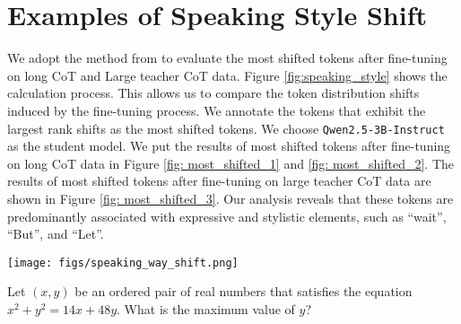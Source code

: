 
\section{Examples of Speaking Style Shift}
\label{Examples of Speaking Style Shift}
We adopt the method from  \citep{lin2023unlockingspellbasellms} to evaluate the most shifted tokens after fine-tuning on long CoT and Large teacher CoT data. Figure \ref{fig:speaking_style} shows the calculation process. This allows us to compare the token distribution shifts induced by the fine-tuning process. We annotate the tokens that exhibit the largest rank shifts as the most shifted tokens. We choose \texttt{Qwen2.5-3B-Instruct} as the student model. We put the results of most shifted tokens after fine-tuning on long CoT data in Figure \ref{fig: most_shifted_1} and \ref{fig: most_shifted_2}. The results of most shifted tokens after fine-tuning on large teacher CoT data are shown in Figure \ref{fig: most_shifted_3}. Our analysis reveals that these tokens are predominantly associated with expressive and stylistic elements, such as “wait”, “But”, and “Let”. 


\begin{figure*}[!t]
    \centering
    \texttt{[image: figs/speaking\_way\_shift.png]}
    \caption{The process of calculating most shifted tokens. We decode each token generated by the fine-tuned LLM in the student model before fine-tuning. Then we calculate the rank shift in the student model for each token generated by the fine-tuned model. We annotate the tokens that exhibit the largest rank shifts as the most shifted tokens. We found that these tokens are predominantly associated with expressive and stylistic elements, such as “But” and “Let”.}
    \label{fig:speaking_style}
\end{figure*}


\begin{figure*}[htbp]
    \centering
\begin{tcolorbox}[title=Problem, promptstyle]
\lstset{
    basicstyle=\normalfont\sffamily\footnotesize,
    breaklines=true,
    frame=none,
    columns=fullflexible,
}
Let $(x,y)$ be an ordered pair of real numbers that satisfies the equation $x^2+y^2=14x+48y$. What is the maximum value of $y$?
\end{tcolorbox}
\end{figure*}






